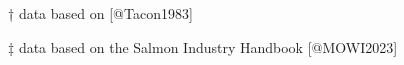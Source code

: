 \begin{sidewaystable}
\begin{threeparttable}
\begin{tabularx}{\textwidth}{XXXXXXXXXXXXXXXXX}
\bottomrule

    \end{tabularx}
    \begin{tablenotes}
      \item[†] data based on [@Tacon1983]
      \item[‡] data based on the Salmon Industry Handbook [@MOWI2023]
    \end{tablenotes}
  \end{threeparttable}
\end{sidewaystable}
